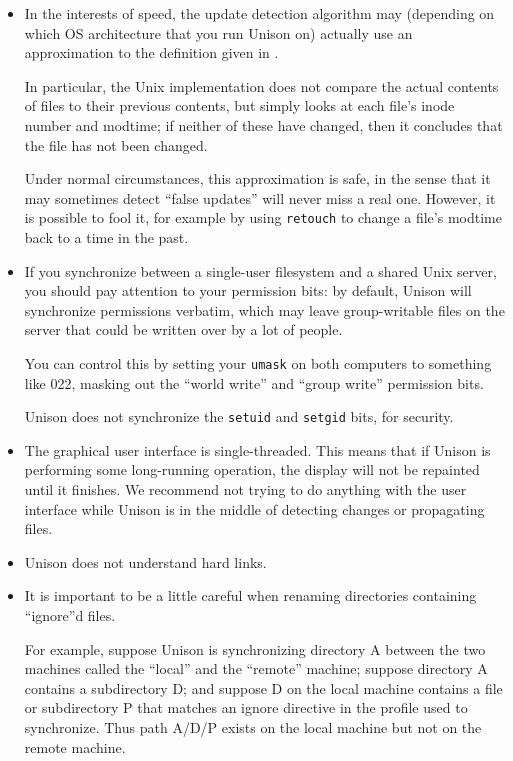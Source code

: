 \documentclass{article}
\begin{document}
\begin{itemize}
\item In the interests of speed, the update detection algorithm may
  (depending on which OS architecture that you run Unison on)
  actually use an approximation to the definition given in
  .  

  In particular, the Unix
  implementation does not compare the actual contents of files to their
  previous contents, but simply looks at each file's inode number and
  modtime; if neither of these have changed, then it concludes that the
  file has not been changed.

  Under normal circumstances, this approximation is safe, in the sense
  that it may sometimes detect ``false updates'' will never miss a real
  one.  However, it is possible to fool it, for example by using
  \verb|retouch| to change a file's modtime back to a time in the past.

\item If you synchronize between a single-user filesystem and a shared
Unix server, you should pay attention to your permission bits: by
default, Unison will synchronize permissions verbatim, which may leave
group-writable files on the server that could be written over by a lot of
people.  

You can control this by setting your \verb|umask| on both computers to
something like 022, masking out the ``world write'' and ``group write''
permission bits.  

Unison does not synchronize the \verb|setuid| and \verb|setgid| bits, for
security. 

\item The graphical user interface is single-threaded.  This
means that if Unison is performing some long-running operation, the
display will not be repainted until it finishes.  We recommend not
trying to do anything with the user interface while Unison is in the
middle of detecting changes or propagating files.

\item Unison does not understand hard links.

\item It is important to be a little careful when renaming directories
containing ``ignore''d files. 

For example, suppose Unison is synchronizing directory A between the two
machines called the ``local'' and the ``remote'' machine; suppose directory
A contains a subdirectory D; and suppose D on the local machine contains a
file or subdirectory P that matches an ignore directive in the profile used
to synchronize. Thus path A/D/P exists on the local machine but not on the
remote machine.
                                                                                

\end{itemize}
\end{document}

